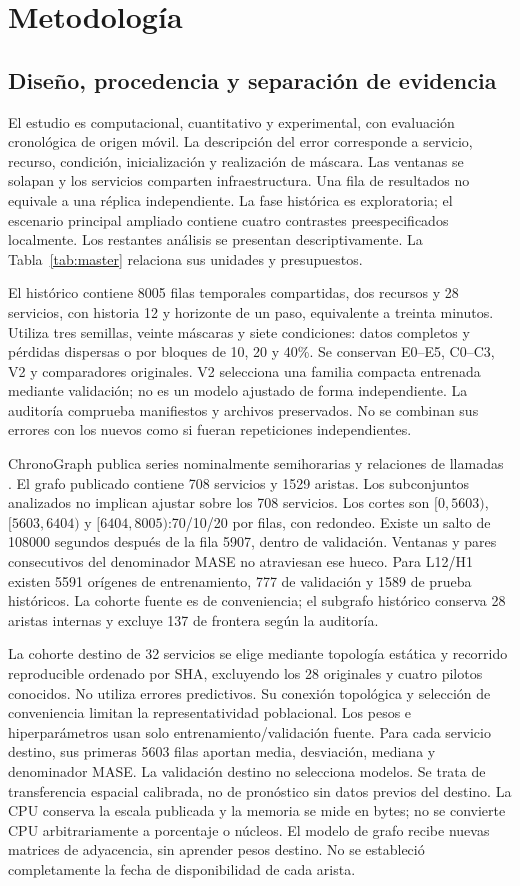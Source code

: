 \section{Metodología}
\subsection{Diseño, procedencia y separación de evidencia}
El estudio es computacional, cuantitativo y experimental, con evaluación cronológica de origen móvil. La descripción del error corresponde a servicio, recurso, condición, inicialización y realización de máscara. Las ventanas se solapan y los servicios comparten infraestructura. Una fila de resultados no equivale a una réplica independiente. La fase histórica es exploratoria; el escenario principal ampliado contiene cuatro contrastes preespecificados localmente. Los restantes análisis se presentan descriptivamente. La Tabla~\ref{tab:master} relaciona sus unidades y presupuestos.

El histórico contiene 8005 filas temporales compartidas, dos recursos y 28 servicios, con historia 12 y horizonte de un paso, equivalente a treinta minutos. Utiliza tres semillas, veinte máscaras y siete condiciones: datos completos y pérdidas dispersas o por bloques de 10, 20 y 40\%. Se conservan E0--E5, C0--C3, V2 y comparadores originales. V2 selecciona una familia compacta entrenada mediante validación; no es un modelo ajustado de forma independiente. La auditoría comprueba manifiestos y archivos preservados. No se combinan sus errores con los nuevos como si fueran repeticiones independientes.

ChronoGraph publica series nominalmente semihorarias y relaciones de llamadas \cite{chronograph}. El grafo publicado contiene 708 servicios y 1529 aristas. Los subconjuntos analizados no implican ajustar sobre los 708 servicios. Los cortes son $[0, 5603)$, $[5603, 6404)$ y $[6404, 8005)$:70/10/20 por filas, con redondeo. Existe un salto de 108000 segundos después de la fila 5907, dentro de validación. Ventanas y pares consecutivos del denominador MASE no atraviesan ese hueco. Para L12/H1 existen 5591 orígenes de entrenamiento, 777 de validación y 1589 de prueba históricos. La cohorte fuente es de conveniencia; el subgrafo histórico conserva 28 aristas internas y excluye 137 de frontera según la auditoría.

La cohorte destino de 32 servicios se elige mediante topología estática y recorrido reproducible ordenado por SHA, excluyendo los 28 originales y cuatro pilotos conocidos. No utiliza errores predictivos. Su conexión topológica y selección de conveniencia limitan la representatividad poblacional. Los pesos e hiperparámetros usan solo entrenamiento/validación fuente. Para cada servicio destino, sus primeras 5603 filas aportan media, desviación, mediana y denominador MASE. La validación destino no selecciona modelos. Se trata de transferencia espacial calibrada, no de pronóstico sin datos previos del destino. La CPU conserva la escala publicada y la memoria se mide en bytes; no se convierte CPU arbitrariamente a porcentaje o núcleos. El modelo de grafo recibe nuevas matrices de adyacencia, sin aprender pesos destino. No se estableció completamente la fecha de disponibilidad de cada arista.


